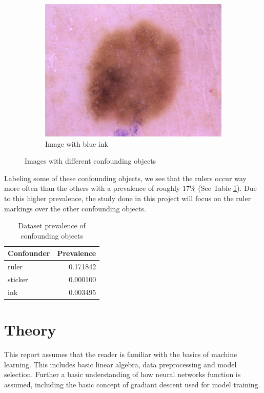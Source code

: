 \documentclass[11pt,a4paper]{article}
\begin{document}
\begin{figure}[ht]
\begin{center}
\begin{subfigure}[b]{0.3\textwidth}
            \includegraphics[width=\textwidth]{./images/ISIC_0027514.jpg}
            \caption{Image with blue ink}
        \end{subfigure}
    \end{center}
    \caption{Images with different confounding objects}
    \label{fig:confounding_objects}
\end{figure}

Labeling some of these confounding objects, we see that the rulers occur way more often than the others with a prevalence of roughly $17\%$ (See Table \ref{table:confounding_objects}).
Due to this higher prevalence, the study done in this project will focus on the ruler markings over the other confounding objects.

\begin{table}
    \centering
    \begin{tabular}{|l|r|}
        \hline 
        Confounder &  Prevalence \\ \hline
        ruler   &  0.171842 \\ \hline
        sticker &  0.000100 \\ \hline
        ink     &  0.003495 \\ \hline
    \end{tabular}
    \caption{Dataset prevalence of confounding objects}
    \label{table:confounding_objects}
\end{table}


\pagebreak

\section{Theory}
This report assumes that the reader is familiar with the basics of machine learning.
This includes basic linear algebra, data preprocessing and model selection.
Further a basic understanding of how neural networks function is assumed,
including the basic concept of gradiant descent used for model training.
\end{document}
